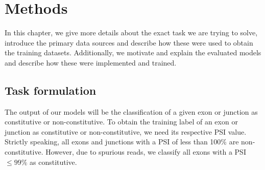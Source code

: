 \chapter{\label{ch:4-methods}Methods}




In this chapter, we give more details about the exact task we are trying to solve, introduce the primary data sources and describe how these were used to obtain the training datasets. Additionally, we motivate and explain the evaluated models and describe how these were implemented and trained.

%
%
%


\section{Task formulation} \label{sec:task_formulation}
The output of our models will be the classification of a given exon or junction as constitutive or non-constitutive. To obtain the training label of an exon or junction as constitutive or non-constitutive, we need its respective PSI value. 
Strictly speaking, all exons and junctions with a PSI of less than 100\% are non-constitutive. However, due to spurious reads, we classify all exons with a PSI $\leq 99\%$ as constitutive. 

